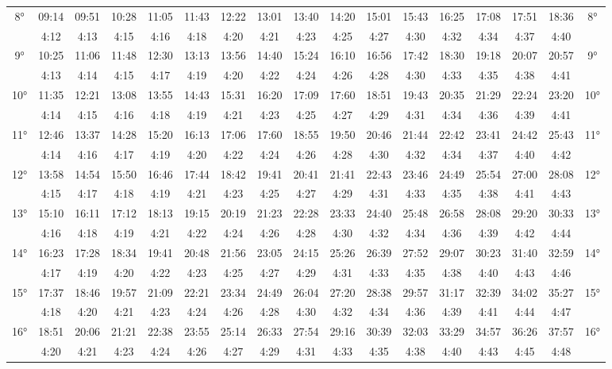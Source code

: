 \begin{scriptsize}
\begin{tabular}{c || c | c | c | c | c | c | c | c | c | c | c | c | c | c | c || c}
		\multirow{2}{*}{8°}&09:14&09:51&10:28&11:05&11:43&12:22&13:01&13:40&14:20&15:01&15:43&16:25&17:08&17:51&18:36&\multirow{2}{*}{8°}\\ \space&4:12&4:13&4:15&4:16&4:18&4:20&4:21&4:23&4:25&4:27&4:30&4:32&4:34&4:37&4:40&\space\\\hline
		\multirow{2}{*}{9°}&10:25&11:06&11:48&12:30&13:13&13:56&14:40&15:24&16:10&16:56&17:42&18:30&19:18&20:07&20:57&\multirow{2}{*}{9°}\\ \space&4:13&4:14&4:15&4:17&4:19&4:20&4:22&4:24&4:26&4:28&4:30&4:33&4:35&4:38&4:41&\space\\\hline
		\multirow{2}{*}{10°}&11:35&12:21&13:08&13:55&14:43&15:31&16:20&17:09&17:60&18:51&19:43&20:35&21:29&22:24&23:20&\multirow{2}{*}{10°}\\ \space&4:14&4:15&4:16&4:18&4:19&4:21&4:23&4:25&4:27&4:29&4:31&4:34&4:36&4:39&4:41&\space\\\hline
		\multirow{2}{*}{11°}&12:46&13:37&14:28&15:20&16:13&17:06&17:60&18:55&19:50&20:46&21:44&22:42&23:41&24:42&25:43&\multirow{2}{*}{11°}\\ \space&4:14&4:16&4:17&4:19&4:20&4:22&4:24&4:26&4:28&4:30&4:32&4:34&4:37&4:40&4:42&\space\\\hline
		\multirow{2}{*}{12°}&13:58&14:54&15:50&16:46&17:44&18:42&19:41&20:41&21:41&22:43&23:46&24:49&25:54&27:00&28:08&\multirow{2}{*}{12°}\\ \space&4:15&4:17&4:18&4:19&4:21&4:23&4:25&4:27&4:29&4:31&4:33&4:35&4:38&4:41&4:43&\space\\\hline
		\multirow{2}{*}{13°}&15:10&16:11&17:12&18:13&19:15&20:19&21:23&22:28&23:33&24:40&25:48&26:58&28:08&29:20&30:33&\multirow{2}{*}{13°}\\ \space&4:16&4:18&4:19&4:21&4:22&4:24&4:26&4:28&4:30&4:32&4:34&4:36&4:39&4:42&4:44&\space\\\hline
		\multirow{2}{*}{14°}&16:23&17:28&18:34&19:41&20:48&21:56&23:05&24:15&25:26&26:39&27:52&29:07&30:23&31:40&32:59&\multirow{2}{*}{14°}\\ \space&4:17&4:19&4:20&4:22&4:23&4:25&4:27&4:29&4:31&4:33&4:35&4:38&4:40&4:43&4:46&\space\\\hline
		\multirow{2}{*}{15°}&17:37&18:46&19:57&21:09&22:21&23:34&24:49&26:04&27:20&28:38&29:57&31:17&32:39&34:02&35:27&\multirow{2}{*}{15°}\\ \space&4:18&4:20&4:21&4:23&4:24&4:26&4:28&4:30&4:32&4:34&4:36&4:39&4:41&4:44&4:47&\space\\\hline
		\multirow{2}{*}{16°}&18:51&20:06&21:21&22:38&23:55&25:14&26:33&27:54&29:16&30:39&32:03&33:29&34:57&36:26&37:57&\multirow{2}{*}{16°}\\ \space&4:20&4:21&4:23&4:24&4:26&4:27&4:29&4:31&4:33&4:35&4:38&4:40&4:43&4:45&4:48&\space\\\hline

\end{tabular}
\end{scriptsize}
